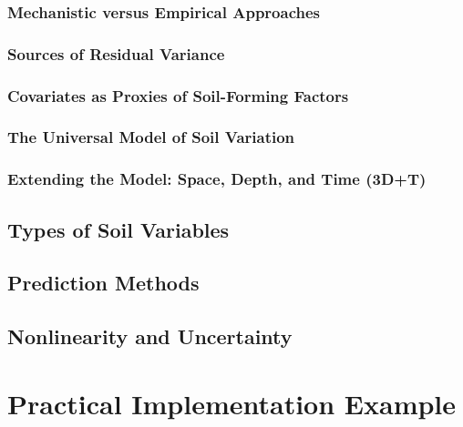 \documentclass[
  10pt,
  b5paper,
  oneside]{book}
\begin{document}
\subsubsection{Mechanistic versus Empirical Approaches}\label{mechanistic-versus-empirical-approaches}

\subsubsection{Sources of Residual Variance}\label{sources-of-residual-variance}

\subsubsection{Covariates as Proxies of Soil-Forming Factors}\label{covariates-as-proxies-of-soil-forming-factors}

\subsubsection{The Universal Model of Soil Variation}\label{the-universal-model-of-soil-variation}

\subsubsection{Extending the Model: Space, Depth, and Time (3D+T)}\label{extending-the-model-space-depth-and-time-3dt}

\subsection{Types of Soil Variables}\label{types-of-soil-variables}

\subsection{Prediction Methods}\label{prediction-methods}

\subsection{Nonlinearity and Uncertainty}\label{nonlinearity-and-uncertainty}

\section{Practical Implementation Example}\label{practical-implementation-example}
\end{document}
